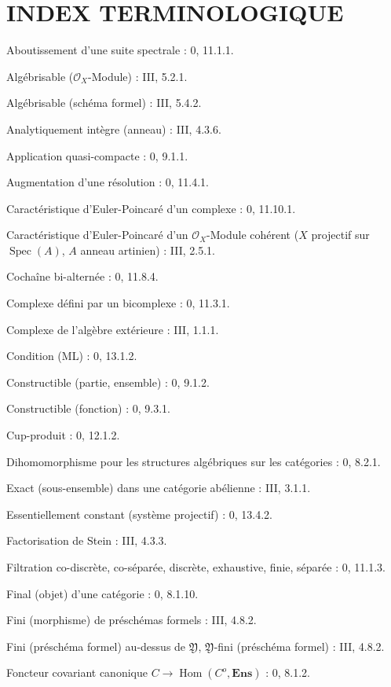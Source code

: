 \section*{INDEX TERMINOLOGIQUE}

\begin{flushleft}
Aboutissement d'une suite spectrale : 0, 11.1.1.

Algébrisable ($\mathcal O_X$-Module) : III, 5.2.1.

Algébrisable (schéma formel) : III, 5.4.2.

Analytiquement intègre (anneau) : III, 4.3.6.

Application quasi-compacte : 0, 9.1.1.

Augmentation d'une résolution : 0, 11.4.1.

Caractéristique d'Euler-Poincaré d'un complexe : 0, 11.10.1.

Caractéristique d'Euler-Poincaré d'un $\mathcal O_X$-Module cohérent ($X$
projectif sur $\operatorname{Spec}(A)$, $A$ anneau artinien) : III, 2.5.1.

Cochaîne bi-alternée : 0, 11.8.4.

Complexe défini par un bicomplexe : 0, 11.3.1.

Complexe de l'algèbre extérieure : III, 1.1.1.

Condition (ML) : 0, 13.1.2.

Constructible (partie, ensemble) : 0, 9.1.2.

Constructible (fonction) : 0, 9.3.1.

Cup-produit : 0, 12.1.2.

Dihomomorphisme pour les structures algébriques sur les catégories : 0, 8.2.1.

Exact (sous-ensemble) dans une catégorie abélienne : III, 3.1.1.

Essentiellement constant (système projectif) : 0, 13.4.2.

Factorisation de Stein : III, 4.3.3.

Filtration co-discrète, co-séparée, discrète, exhaustive, finie, séparée :
0, 11.1.3.

Final (objet) d'une catégorie : 0, 8.1.10.

Fini (morphisme) de préschémas formels : III, 4.8.2.

Fini (préschéma formel) au-dessus de $\mathfrak Y$,
$\mathfrak Y$-fini (préschéma formel) : III, 4.8.2.

Foncteur covariant canonique $C\to\operatorname{Hom}(C^o,\mathbf{Ens})$ :
0, 8.1.2.


\end{flushleft}
